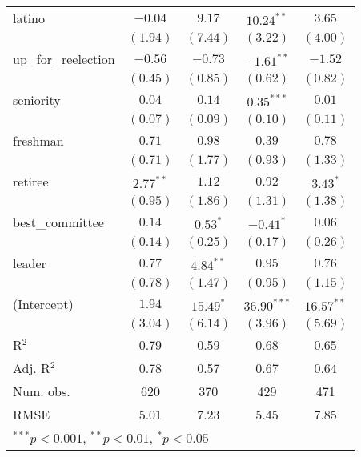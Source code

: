 \documentclass[12pt]{article}
\begin{document}
\begin{table}
\begin{center}
\begin{tabular}{l c c c c }
			latino                 & $-0.04$       & $9.17$        & $10.24^{**}$   & $3.65$        \\
			& $(1.94)$      & $(7.44)$      & $(3.22)$       & $(4.00)$      \\
			up\_for\_reelection    & $-0.56$       & $-0.73$       & $-1.61^{**}$   & $-1.52$       \\
			& $(0.45)$      & $(0.85)$      & $(0.62)$       & $(0.82)$      \\
			seniority              & $0.04$        & $0.14$        & $0.35^{***}$   & $0.01$        \\
			& $(0.07)$      & $(0.09)$      & $(0.10)$       & $(0.11)$      \\
			freshman               & $0.71$        & $0.98$        & $0.39$         & $0.78$        \\
			& $(0.71)$      & $(1.77)$      & $(0.93)$       & $(1.33)$      \\
			retiree                & $2.77^{**}$   & $1.12$        & $0.92$         & $3.43^{*}$    \\
			& $(0.95)$      & $(1.86)$      & $(1.31)$       & $(1.38)$      \\
			best\_committee        & $0.14$        & $0.53^{*}$    & $-0.41^{*}$    & $0.06$        \\
			& $(0.14)$      & $(0.25)$      & $(0.17)$       & $(0.26)$      \\
			leader                 & $0.77$        & $4.84^{**}$   & $0.95$         & $0.76$        \\
			& $(0.78)$      & $(1.47)$      & $(0.95)$       & $(1.15)$      \\
			(Intercept)            & $1.94$        & $15.49^{*}$   & $36.90^{***}$  & $16.57^{**}$  \\
			& $(3.04)$      & $(6.14)$      & $(3.96)$       & $(5.69)$      \\
			\hline
			R$^2$                  & 0.79          & 0.59          & 0.68           & 0.65          \\
			Adj. R$^2$             & 0.78          & 0.57          & 0.67           & 0.64          \\
			Num. obs.              & 620           & 370           & 429            & 471           \\
			RMSE                   & 5.01          & 7.23          & 5.45           & 7.85          \\
			\hline
			\multicolumn{5}{l}{\scriptsize{$^{***}p<0.001$, $^{**}p<0.01$, $^*p<0.05$}}
		\end{tabular}
	\end{center}
\end{table}
	
\end{document}
